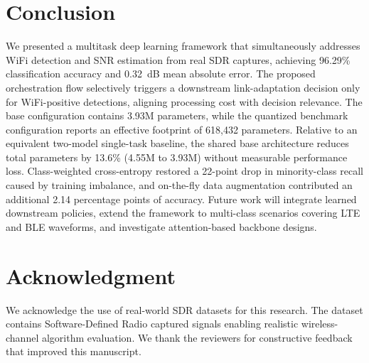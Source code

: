 \documentclass[conference]{IEEEtran}
\begin{document}
\section{Conclusion}

We presented a multitask deep learning framework that simultaneously addresses WiFi detection and SNR estimation from real SDR captures, achieving 96.29\% classification accuracy and 0.32~dB mean absolute error. The proposed orchestration flow selectively triggers a downstream link-adaptation decision only for WiFi-positive detections, aligning processing cost with decision relevance. The base configuration contains 3.93M parameters, while the quantized benchmark configuration reports an effective footprint of 618,432 parameters. Relative to an equivalent two-model single-task baseline, the shared base architecture reduces total parameters by 13.6\% (4.55M to 3.93M) without measurable performance loss. Class-weighted cross-entropy restored a 22-point drop in minority-class recall caused by training imbalance, and on-the-fly data augmentation contributed an additional 2.14 percentage points of accuracy. Future work will integrate learned downstream policies, extend the framework to multi-class scenarios covering LTE and BLE waveforms, and investigate attention-based backbone designs.

\section*{Acknowledgment}

We acknowledge the use of real-world SDR datasets for this research. The dataset contains Software-Defined Radio captured signals enabling realistic wireless-channel algorithm evaluation. We thank the reviewers for constructive feedback that improved this manuscript.



\end{document}
